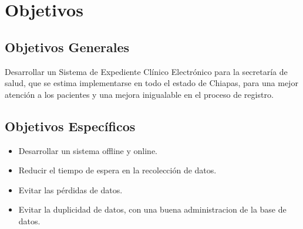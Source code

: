 \section{Objetivos}

    \subsection{Objetivos Generales}
    \label{subsec:objGrales}
  Desarrollar un Sistema de Expediente Clínico Electrónico para la secretaría de salud, que se estima implementarse en todo el estado de Chiapas, para una mejor atención a los pacientes y una mejora inigualable en el proceso de registro.

    \subsection{Objetivos Específicos}
    \label{subsec:objetivos especificos}
\begin{itemize}
  \item Desarrollar un sistema offline y online.
  \item Reducir el tiempo de espera en la recolección de datos.
  \item Evitar las pérdidas de datos.
  \item Evitar la duplicidad de datos, con una buena administracion de la base de datos.

\end{itemize}

